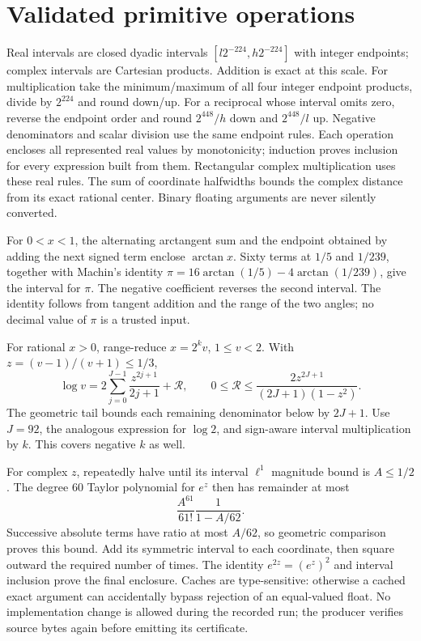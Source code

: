 \section{Validated primitive operations}
Real intervals are closed dyadic intervals $[l2^{-224},h2^{-224}]$ with
integer endpoints; complex intervals are Cartesian products. Addition is
exact at this scale. For multiplication take the minimum/maximum of all four
integer endpoint products, divide by $2^{224}$ and round down/up. For a
reciprocal whose interval omits zero, reverse the endpoint order and round
$2^{448}/h$ down and $2^{448}/l$ up. Negative denominators and scalar division
use the same endpoint rules. Each operation encloses all represented real
values by monotonicity; induction proves inclusion for every expression
built from them. Rectangular complex multiplication uses these real rules.
The sum of coordinate halfwidths bounds the complex distance from its exact
rational center. Binary floating arguments are never silently converted.

For $0<x<1$, the alternating arctangent sum and the endpoint obtained by
adding the next signed term enclose $\arctan x$. Sixty terms at $1/5$ and
$1/239$, together with Machin's identity
$\pi=16\arctan(1/5)-4\arctan(1/239)$, give the interval for $\pi$.
The negative coefficient reverses the second interval. The identity follows
from tangent addition and the range of the two angles; no decimal value of
$\pi$ is a trusted input.

For rational $x>0$, range-reduce $x=2^kv$, $1\le v<2$. With
$z=(v-1)/(v+1)\le1/3$,
\[
 \log v=2\sum_{j=0}^{J-1}\frac{z^{2j+1}}{2j+1}+\mathcal R,
 \qquad 0\le\mathcal R\le
 \frac{2z^{2J+1}}{(2J+1)(1-z^2)}.
\]
The geometric tail bounds each remaining denominator below by $2J+1$.
Use $J=92$, the analogous expression for $\log2$, and sign-aware interval
multiplication by $k$. This covers negative $k$ as well.

For complex $z$, repeatedly halve until its interval $\ell^1$ magnitude
bound is $A\le1/2$. The degree $60$ Taylor polynomial for $e^z$ then has remainder
at most
\[
 \frac{A^{61}}{61!}\frac1{1-A/62}.
\]
Successive absolute terms have ratio at most $A/62$, so geometric comparison
proves this bound. Add its symmetric interval to each coordinate, then square
outward the required number of times. The identity $e^{2z}=(e^z)^2$ and
interval inclusion prove the final enclosure. Caches are type-sensitive:
otherwise a cached exact argument can accidentally bypass rejection of an
equal-valued float. No implementation change is allowed during the recorded run;
the producer verifies source bytes again before emitting its certificate.

